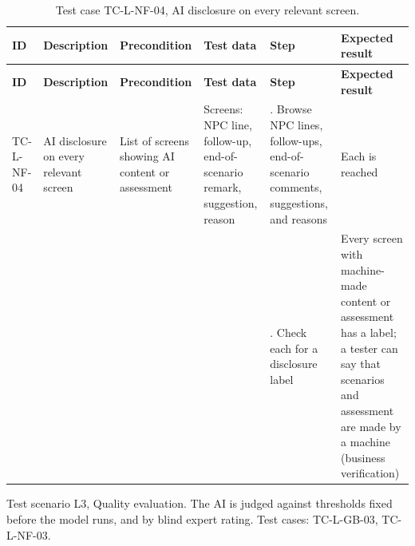 {\footnotesize{}\renewcommand{\arraystretch}{1.1}
\begin{longtable}{|>{\raggedright\arraybackslash}p{}|>{\raggedright\arraybackslash}p{}|>{\raggedright\arraybackslash}p{}|>{\raggedright\arraybackslash}p{}|>{\raggedright\arraybackslash}p{}|>{\raggedright\arraybackslash}p{}|}
\caption{Test case TC-L-NF-04, AI disclosure on every relevant screen.} \\
\hline
\textbf{ID} & \textbf{Description} & \textbf{Precondition} & \textbf{Test data} & \textbf{Step} & \textbf{Expected result} \\ \hline
\endfirsthead
\hline
\textbf{ID} & \textbf{Description} & \textbf{Precondition} & \textbf{Test data} & \textbf{Step} & \textbf{Expected result} \\ \hline
\endhead
TC-L-NF-04 & AI disclosure on every relevant screen & List of screens showing AI content or assessment & Screens: NPC line, follow-up, end-\allowbreak{}of-\allowbreak{}scenario remark, suggestion, reason & 1. Browse NPC lines, follow-ups, end-\allowbreak{}of-\allowbreak{}scenario comments, suggestions, and reasons & Each is reached \\ \cline{5-6}
 &  &  &  & 2. Check each for a disclosure label & Every screen with machine-\allowbreak{}made content or assessment has a label; a tester can say that scenarios and assessment are made by a machine (business verification) \\ \hline
\end{longtable}
}

Test scenario L3, Quality evaluation. The AI is judged against thresholds fixed before the model runs, and by blind expert rating. Test cases: TC-L-GB-03, TC-L-NF-03.

